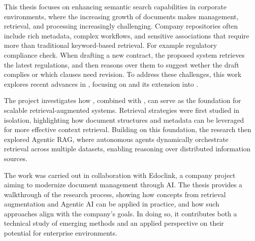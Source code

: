 \glsresetall
\noindent  
This thesis focuses on enhancing semantic search capabilities in corporate environments, where the increasing growth of documents makes management, retrieval, and processing increasingly challenging. Company repositories often include rich metadata, complex workflows, and sensitive associations that require more than traditional keyword-based retrieval. For example regulatory compliance check. When drafting a new contract, the proposed system retrieves the latest regulations, and then reasons over them to suggest wether the draft complies or which clauses need revision.
To address these challenges, this work explores recent advances in , focusing on  and its extension into .

The project investigates how  , combined with , can serve as the foundation for scalable retrieval-augmented systems. Retrieval strategies were first studied in isolation, highlighting how document structures and metadata can be leveraged for more effective context retrieval. Building on this foundation, the research then explored Agentic RAG, where autonomous agents dynamically orchestrate retrieval across multiple datasets, enabling reasoning over distributed information sources.

The work was carried out in collaboration with Edoclink, a company project aiming to modernize document management through AI. The thesis provides a walkthrough of the research process, showing how concepts from retrieval augmentation and Agentic AI can be applied in practice, and how such approaches align with the company’s goals. In doing so, it contributes both a technical study of emerging methods and an applied perspective on their potential for enterprise environments.





